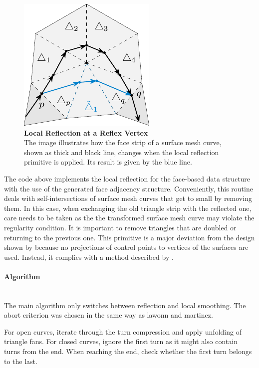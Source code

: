 \documentclass{stdlocal}
\begin{document}
  \begin{figure}
    \centering
    \includegraphics[width=0.45\linewidth]{figures/local-reflection.pdf}
    \caption[Local Reflection at a Reflex Vertex]{%
      \textbf{Local Reflection at a Reflex Vertex}\\
      The image illustrates how the face strip of a surface mesh curve, shown as thick and black line, changes when the local reflection primitive is applied.
      Its result is given by the blue line.
    }
    \label{fig:local-reflection}
  \end{figure}

  The code above implements the local reflection for the face-based data structure with the use of the generated face adjacency structure.
  Conveniently, this routine deals with self-intersections of surface mesh curves that get to small by removing them.
  In this case, when exchanging the old triangle strip with the reflected one, care needs to be taken as the the transformed surface mesh curve may violate the regularity condition.
  It is important to remove triangles that are doubled or returning to the previous one.
  This primitive is a major deviation from the design shown by \textcite{lawonn2014} because no projections of control points to vertices of the surfaces are used.
  Instead, it complies with a method described by \textcite{mancinelli2022}.

  \paragraph{Algorithm}\hfill\\
  The main algorithm only switches between reflection and local smoothing.
  The abort criterion was chosen in the same way as lawonn and martinez.

  For open curves, iterate through the turn compression and apply unfolding of triangle fans.
  For closed curves, ignore the first turn as it might also contain turns from the end.
  When reaching the end, check whether the first turn belongs to the last.
\end{document}
